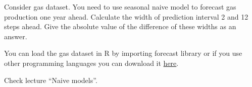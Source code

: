 
\begin{question}
Consider gas dataset. You need to use seasonal naive model to forecast gas production one year ahead. Calculate the width of prediction interval 2 and 12 steps ahead. Give the absolute value of the difference of these widths as an answer.

You can load the gas dataset in R by importing forecast library or if you use other programming languages you can download it \href{https://github.com/vincentarelbundock/Rdatasets/blob/master/csv/forecast/gas.csv}{here}.
\end{question}

\begin{solution}
Check lecture ``Naive models''.
\end{solution}

